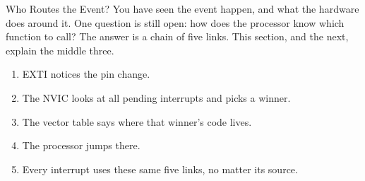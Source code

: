 \documentclass[9pt,aspectratio=169,xcolor=table]{beamer}
\begin{document}
\begin{frame}{Who Routes the Event?}
    \leavevmode
    {\small You have seen the event happen, and what the hardware does
    around it. One question is still open: \alert{how does the processor
    know which function to call?} The answer is a chain of five links.
    This section, and the next, explain the middle three.}

    \vspace{4mm}
    \begin{center}
    \end{center}

    \vspace{4mm}

{\small
	\begin{enumerate}
		\item \alert{EXTI} notices the pin change.
		\item The \alert{NVIC} looks at all pending interrupts and picks a winner.
		\item The \alert{vector table} says where that winner's code lives.
		\item The processor jumps there.
		\item Every interrupt uses these same five links, no matter its source.
	\end{enumerate}
	}\end{frame}
\end{document}
